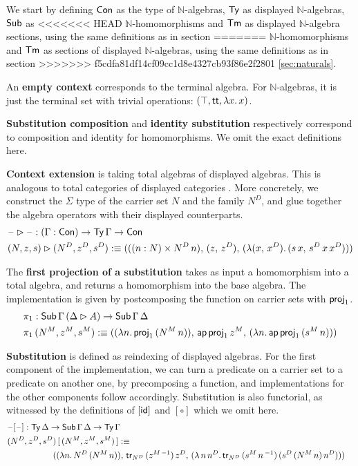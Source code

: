 \documentclass[acmsmall,review,anonymous]{acmart}\settopmatter{printfolios=true,printccs=false,printacmref=false}
\begin{document}
We start by defining $\Con$ as the type of $\mathbb{N}$-algebras,
$\Ty$ as displayed $\mathbb{N}$-algebras, $\Tms$ as
<<<<<<< HEAD
$\mathbb{N}$-homomorphisms and $\Tm$ as displayed
$\mathbb{N}$-algebra sections, using the same definitions as in section
=======
$\mathbb{N}$-homomorphisms and $\Tm$ as sections of displayed
$\mathbb{N}$-algebras, using the same definitions as in section
>>>>>>> f5cdfa81df14cf09cc1d8e4327cb93f86e2f2801
\ref{sec:naturals}.

An \textbf{empty context} corresponds to the terminal algebra.  For
$\mathbb{N}$-algebras, it is just the terminal set with trivial
operations: $(\top, \tt, \lambda x.\,x)$.

\textbf{Substitution composition} and \textbf{identity substitution}
respectively correspond to composition and identity for
homomorphisms. We omit the exact definitions here.

\textbf{Context extension} is taking total algebras of displayed
algebras. This is analogous to total categories of displayed
categories \cite{displayedCategories}. More concretely, we construct
the $\Sigma$ type of the carrier set $N$ and the family $N^D$, and
glue together the algebra operators with their displayed counterparts.
\begin{alignat*}{5}
  & \blank\rhd \blank : (\Gamma : \Con) \ra \Ty\,\Gamma \ra \Con \\
  & (N, z, s) \rhd (N^D, z^D, s^D) :\equiv
  (((n : N) \times N^D\,n),\,(z,\,z^D),\,(\lambda (x,\,x^D).\,(s\,x,\,s^D\,x\,x^D)))
\end{alignat*}

The \textbf{first projection of a substitution} takes as input a
homomorphism into a total algebra, and returns a homomorphism into the
base algebra. The implementation is given by postcomposing the
function on carrier sets with $\proj_1$.
\begin{alignat*}{5}
  & \pi_1 : \Tms\,\Gamma\,(\Delta\rhd A)\ra\Tms\,\Gamma\,\Delta \\
  & \pi_1\,(N^M, z^M, s^M) :\equiv ((\lambda n.\, \proj_1\,(N^M\,n)),\,\ap\,\proj_1\,z^M,\, (\lambda n.\,\ap\,\proj_1\,(s^M\,n)))
\end{alignat*}

\textbf{Substitution} is defined as reindexing of displayed
algebras. For the first component of the implementation, we can turn a
predicate on a carrier set to a predicate on another one, by
precomposing a function, and implementations for the other components
follow accordingly. Substitution is also functorial, as witnessed by
the definitions of $[\id]$ and $[\circ]$ which we omit here.
\begin{alignat*}{5}
  & \blank[\blank] : \Ty\,\Delta\ra\Tms\,\Gamma\,\Delta\ra\Ty\,\Gamma \\
  & (N^D, z^D, s^D)\,[\,(N^M, z^M, s^M)\,] :\equiv \\
  & && \hspace{-10em}
  ((\lambda n.\,N^D\,(N^M\,n)),\,\tr_{N^D}\,(z^{M\,-1})\,z^D,\,(\lambda\,n\,n^D.\,\tr_{N^D}\,(s^M\,n\,^{-1})\,(s^D\,(N^M\,n)\,n^D)))
\end{alignat*}
\end{document}
